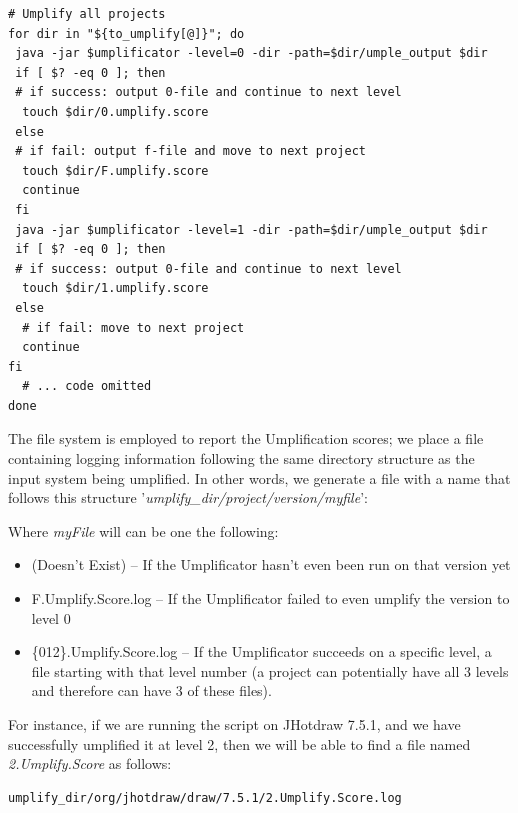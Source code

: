 \begin{lstlisting}[style=mine, label=lst:script, caption=Part of the script responsible to umplify and report results]
# Umplify all projects
for dir in "${to_umplify[@]}"; do
 java -jar $umplificator -level=0 -dir -path=$dir/umple_output $dir
 if [ $? -eq 0 ]; then 
 # if success: output 0-file and continue to next level
  touch $dir/0.umplify.score
 else 
 # if fail: output f-file and move to next project
  touch $dir/F.umplify.score
  continue
 fi
 java -jar $umplificator -level=1 -dir -path=$dir/umple_output $dir 
 if [ $? -eq 0 ]; then 
 # if success: output 0-file and continue to next level
  touch $dir/1.umplify.score
 else 
  # if fail: move to next project
  continue
fi
  # ... code omitted
done
\end{lstlisting}

The file system is employed to report the Umplification scores; we place a file containing logging information following the same directory structure as the input system being umplified. In other words, 
we generate a file with a name that follows this structure '\textit{umplify\_dir/project/version/myfile}':

Where \textit{myFile} will can be one the following:
\begin{itemize}
\item (Doesn't Exist) -- If the Umplificator hasn't even been run on that version yet
\item F.Umplify.Score.log -- If the Umplificator failed to even umplify the version to level 0
\item \{012\}.Umplify.Score.log -- If the Umplificator succeeds on a specific level, a file starting with that level number (a project can potentially have all 3 levels and therefore can have 3 of these files).
\end{itemize}

For instance, if we are running the script on JHotdraw 7.5.1, and we have successfully umplified it at level 2, then we will be able to find a file named \textit{2.Umplify.Score} as follows:

\vspace{\baselineskip}
\begin{lstlisting}[style=umplePlain]
   umplify_dir/org/jhotdraw/draw/7.5.1/2.Umplify.Score.log
\end{lstlisting}


